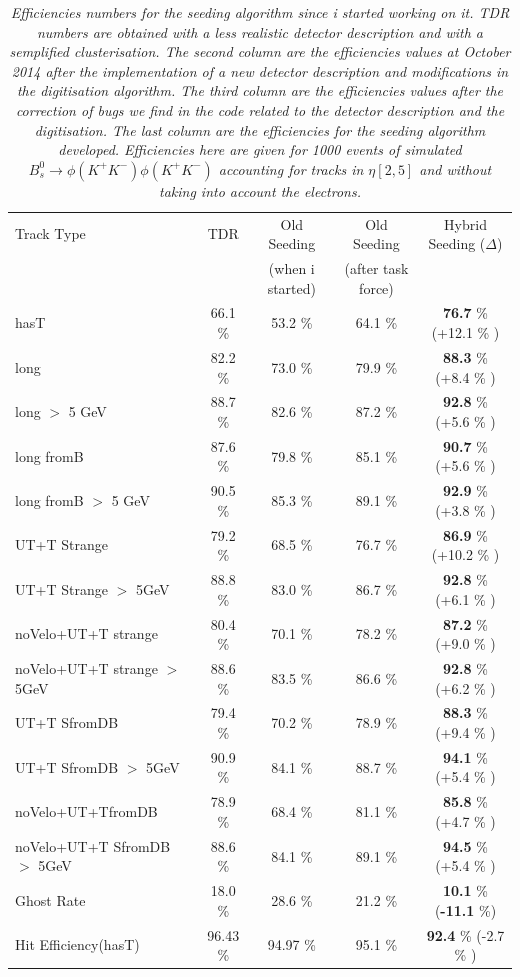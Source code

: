 \documentclass[paper=a4, fontsize=10pt]{scrartcl}
\numberwithin{equation}{section}		%
\numberwithin{figure}{section}			%
\numberwithin{table}{section}				%
\begin{document}
\begin{table}[h!]
\centering 
\begin{tabular}{|l|c|c|c|c}
Track Type & TDR & Old Seeding & Old Seeding & Hybrid Seeding ($\Delta$) \\
  & & (when i started) & (after task force) & \\
\hline
hasT & 66.1 \% &   53.2 \% & 64.1 \% & \textbf{76.7} \% (+12.1 \% )\\
long & 82.2 \% &   73.0 \% & 79.9 \% & \textbf{88.3} \% (+8.4 \% )  \\
long $>$ 5 GeV & 88.7 \% &  82.6 \% & 87.2 \% & \textbf{92.8} \%  (+5.6 \% )  \\ \hline
long fromB & 87.6 \% &  79.8 \% & 85.1 \% &\textbf{90.7} \%  (+5.6 \% )  \\
long fromB $>$ 5 GeV & 90.5 \% &  85.3 \% & 89.1 \% &\textbf{92.9} \% (+3.8 \% ) \\ \hline
UT+T Strange & 79.2 \% &  68.5 \% & 76.7 \% & \textbf{86.9} \%  (+10.2 \% ) \\
UT+T Strange $>$ 5GeV & 88.8 \% & 83.0 \% & 86.7 \% & \textbf{92.8} \%  (+6.1 \% ) \\ \hline
noVelo+UT+T strange & 80.4 \% & 70.1 \% & 78.2 \% & \textbf{87.2} \%   (+9.0 \% )  \\
noVelo+UT+T strange $>$ 5GeV & 88.6 \% & 83.5 \% & 86.6 \% & \textbf{92.8} \% (+6.2 \% ) \\ \hline
UT+T SfromDB & 79.4 \% &  70.2 \% & 78.9 \% & \textbf{88.3} \% (+9.4 \% ) \\
UT+T SfromDB $>$ 5GeV & 90.9 \% &   84.1 \% & 88.7 \% & \textbf{94.1} \% (+5.4 \% )\\ \hline
noVelo+UT+TfromDB & 78.9 \% & 68.4 \% & 81.1 \% & \textbf{85.8} \%  (+4.7 \% )\\
noVelo+UT+T SfromDB $>$ 5GeV & 88.6 \% & 84.1 \% & 89.1 \% & \textbf{94.5} \% (+5.4 \% )\\ \hline
Ghost Rate & 18.0 \% & 28.6 \% & 21.2 \% & \textbf{10.1} \%  (\textbf{-11.1} \%)  \\
Hit Efficiency(hasT) & 96.43 \% & 94.97 \% & 95.1 \% & \textbf{92.4} \% (-2.7 \% ) \\
\end{tabular}
\caption{\emph{Efficiencies numbers for the seeding algorithm since i started working on it.
TDR numbers are obtained with a less realistic detector description and with a semplified clusterisation. The second column are the efficiencies values at October 2014 after the implementation of a new detector description and modifications in the digitisation algorithm. The third column are the efficiencies values after the correction of bugs we find in the code related to the detector description and the digitisation. The last column are the efficiencies for the seeding algorithm developed. Efficiencies here are given for 1000 events of simulated $B^{0}_{s}\rightarrow \phi(K^+K^-)\phi(K^{+}K^{-})$ accounting for tracks in $\eta [2,5]$ and without taking into account the electrons.}}\label{table}
\end{table}
\end{document}
